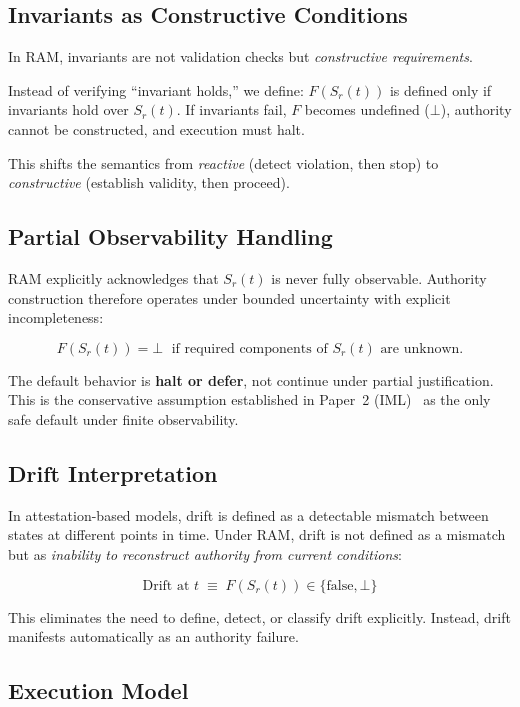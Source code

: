 \documentclass[11pt]{article}
\newcommand{\Sr}{S_r}
\newcommand{\St}[1]{S_r(#1)}
\newcommand{\Ndefval}{\bot}
\begin{document}
\subsection{Invariants as Constructive Conditions}

In RAM, invariants are not validation checks but \emph{constructive requirements}.

Instead of verifying ``invariant holds,'' we define:
$F(\St{t})$ is defined only if invariants hold over $\St{t}$.
If invariants fail, $F$ becomes undefined ($\Ndefval$), authority cannot be constructed,
and execution must halt.

This shifts the semantics from \emph{reactive} (detect violation, then stop)
to \emph{constructive} (establish validity, then proceed).

\subsection{Partial Observability Handling}

RAM explicitly acknowledges that $\Sr(t)$ is never fully observable.
Authority construction therefore operates under bounded uncertainty with
explicit incompleteness:

\[
F(\St{t}) = \Ndefval \;\text{ if required components of } \Sr(t) \text{ are unknown.}
\]

The default behavior is \textbf{halt or defer}, not continue under partial
justification.
This is the conservative assumption established in Paper~2 (IML)~\cite{fernandez2026c}
as the only safe default under finite observability.

\subsection{Drift Interpretation}

In attestation-based models, drift is defined as a detectable mismatch between
states at different points in time.
Under RAM, drift is not defined as a mismatch but as \emph{inability to
reconstruct authority from current conditions}:

\[
\text{Drift at } t \;\equiv\; F(\St{t}) \in \{\text{false}, \Ndefval\}
\]

This eliminates the need to define, detect, or classify drift explicitly.
Instead, drift manifests automatically as an authority failure.

\subsection{Execution Model}
\end{document}
